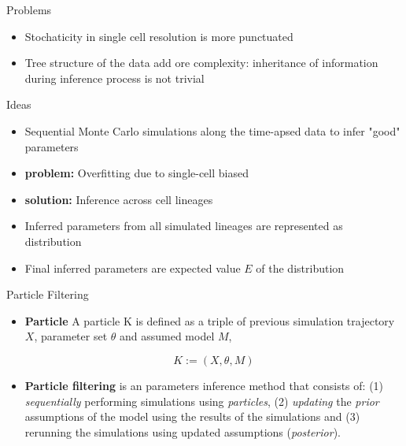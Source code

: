 \documentclass[pdf]
{beamer}
\begin{document}
\begin{frame}{Problems}
	\begin{itemize}
	\item Stochaticity in single cell resolution is more punctuated
	\item Tree structure of the data add ore complexity: inheritance of information during inference process is not trivial
	\end{itemize}
\end{frame}

\begin{frame}{Ideas}
	\begin{itemize}
	\item Sequential Monte Carlo simulations along the time-apsed data to infer "good" parameters
	\item<2-> \textbf{problem:} Overfitting due to single-cell biased
	\item<3-> \textbf{solution:} Inference across cell lineages
	\item<4-> Inferred parameters from all simulated lineages are represented as distribution
	\item<5-> Final inferred parameters are expected value $E$ of the distribution
	\end{itemize}
\end{frame}

\begin{frame}{Particle Filtering}

	\begin{itemize}

	\item \textbf{Particle}
	A particle K is defined as a triple of previous simulation trajectory $X$, parameter set $\theta$ and
assumed model $M$,

		\begin{equation}
		K := (X, \theta, M)
		\end{equation}
		
	\item \textbf{Particle filtering} is an parameters inference method that consists of: (1) \textit{sequentially} performing simulations using \textit{particles}, (2) \textit{updating} the \textit{prior} assumptions of the model using the results of the simulations and (3) rerunning the simulations using updated assumptions (\textit{posterior}).
	
	\end{itemize}

\end{frame}
\end{document}

